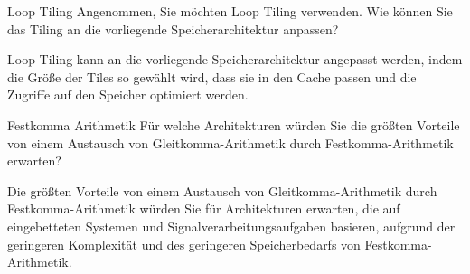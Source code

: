 \documentclass{article}
\begin{document}
\begin{exercise}{Loop Tiling}
  Angenommen, Sie möchten Loop Tiling verwenden. Wie können Sie das Tiling an die vorliegende Speicherarchitektur anpassen?

  \begin{solution}
    Loop Tiling kann an die vorliegende Speicherarchitektur angepasst werden, indem die Größe der Tiles so gewählt wird, dass sie in den Cache passen und die Zugriffe auf den Speicher optimiert werden.
  \end{solution}
\end{exercise}

\begin{exercise}{Festkomma Arithmetik}
  Für welche Architekturen würden Sie die größten Vorteile von einem Austausch von Gleitkomma-Arithmetik durch Festkomma-Arithmetik erwarten?

  \begin{solution}
    Die größten Vorteile von einem Austausch von Gleitkomma-Arithmetik durch Festkomma-Arithmetik würden Sie für Architekturen erwarten, die auf eingebetteten Systemen und Signalverarbeitungsaufgaben basieren, aufgrund der geringeren Komplexität und des geringeren Speicherbedarfs von Festkomma-Arithmetik.
  \end{solution}
\end{exercise}
\end{document}
